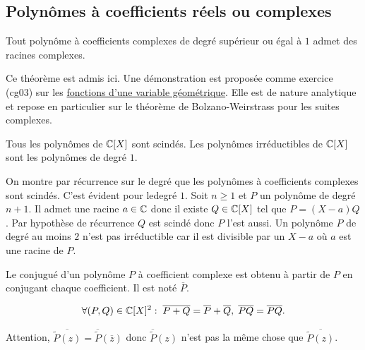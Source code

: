 \subsection{Polynômes à coefficients réels ou complexes}
\begin{thm}
 Tout polynôme à coefficients complexes de degré supérieur ou égal à $1$ admet des racines complexes.
\end{thm}
\begin{demo}
 Ce théorème est admis ici. Une démonstration est proposée comme exercice (cg03) sur les \href{http://back.maquisdoc.net/data/temptex/fexcg.pdf}{fonctions d'une variable géométrique}. Elle est de nature analytique et repose en particulier sur le théorème de Bolzano-Weirstrass pour les suites complexes.
\end{demo}
\begin{prop}
 Tous les polynômes de $\mathbb{C}[X]$ sont scindés.  Les polynômes irréductibles de $\mathbb{C}[X]$ sont les polynômes de degré $1$.
\end{prop}
\begin{demo}
On montre par récurrence sur le degré que les polynômes à coefficients complexes sont scindés. C'est évident pour ledegré $1$. Soit $n\geq 1$ et $P$ un polynôme de degré $n+1$. Il admet une racine $a \in \mathbb{C}$ donc il existe $Q\in \mathbb{C}[X]$ tel que $P = (X-a)Q$. Par hypothèse de récurrence $Q$ est scindé donc $P$ l'est aussi.\newline
Un polynôme $P$ de degré au moins $2$ n'est pas irréductible car il est divisible par un $X-a$ où $a$ est une racine de $P$.  
\end{demo}
\begin{defi}
 Le conjugué d'un polynôme $P$ à coefficient complexe est obtenu à partir de $P$ en conjugant chaque coefficient. Il est noté $\overline{P}$.
\end{defi}
\begin{prop}
 \begin{displaymath}
\forall (P,Q)\in \mathbb{C}[X]^2:\; \overline{P+Q}=\overline{P}+\overline{Q} ,\;\overline{PQ}=\overline{P}\overline{Q}. 
 \end{displaymath}
\end{prop}
\begin{rem}
 Attention, $\overline{\widetilde{P}(z)} = \overline{\widetilde{P}}(\overline{z})$ donc $\overline{\widetilde{P}}(z)$ n'est pas la même chose que $\overline{\widetilde{P}(z)}$.
\end{rem}

